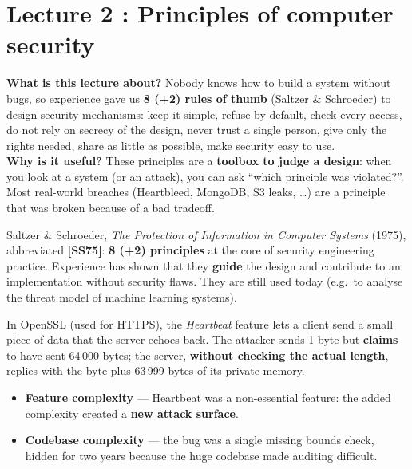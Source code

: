 \chapter{Lecture 2 : Principles of computer security}

\begin{rembox}[title=In a nutshell]
\textbf{What is this lecture about?} Nobody knows how to build a system without bugs, so
experience gave us \textbf{8 (+2) rules of thumb} (Saltzer \& Schroeder) to design
security mechanisms: keep it simple, refuse by default, check every access, do not rely on
secrecy of the design, never trust a single person, give only the rights needed, share as
little as possible, make security easy to use. \\
\textbf{Why is it useful?} These principles are a \textbf{toolbox to judge a design}: when
you look at a system (or an attack), you can ask ``which principle was violated?''. Most
real-world breaches (Heartbleed, MongoDB, S3 leaks, \ldots) are a principle that was
broken because of a bad tradeoff.
\end{rembox}

\begin{rembox}[title=Where do the principles come from?]
Saltzer \& Schroeder, \textit{The Protection of Information in Computer Systems} (1975),
abbreviated \textbf{[SS75]}: \textbf{8 (+2) principles} at the core of security
engineering practice. Experience has shown that they \textbf{guide} the design and
contribute to an implementation without security flaws. They are still used today
(e.g.\ to analyse the threat model of machine learning systems).
\end{rembox}

\begin{exbox}[title=Heartbleed (CVE-2014-0160) --- why simplicity matters]
In OpenSSL (used for HTTPS), the \textit{Heartbeat} feature lets a client send a small
piece of data that the server echoes back. The attacker sends 1 byte but
\textbf{claims} to have sent 64\,000 bytes; the server, \textbf{without checking the
actual length}, replies with the byte plus 63\,999 bytes of its private memory.
\begin{itemize}
  \item \textbf{Feature complexity} --- Heartbeat was a non-essential feature: the
        added complexity created a \textbf{new attack surface}.
  \item \textbf{Codebase complexity} --- the bug was a single missing bounds check,
        hidden for two years because the huge codebase made auditing difficult.
\end{itemize}
\end{exbox}

